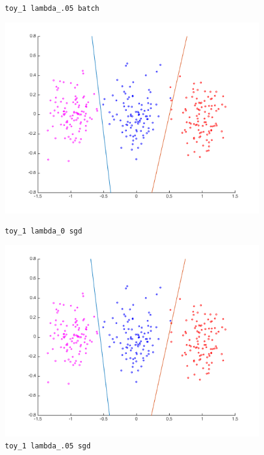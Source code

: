 \documentclass[11pt,letterpaper]{article}
\begin{document}
\begin{figure}[!htb]
  \caption{\texttt{toy\_1 lambda\_.05 batch}}\label{fig:gradDifN}
\endminipage\hfill
{}
  \includegraphics[width=\linewidth]{figures/sgd_lambda0_toy.png}
  \caption{\texttt{toy\_1 lambda\_0 sgd}}\label{fig:gradDifSs}
\endminipage\hfill
{}
  \includegraphics[width=\linewidth]{figures/sgd_lambda1_toy.png}
  \caption{\texttt{toy\_1 lambda\_.05 sgd}}\label{fig:gradDifS}
\endminipage
\end{figure}
\end{document}

